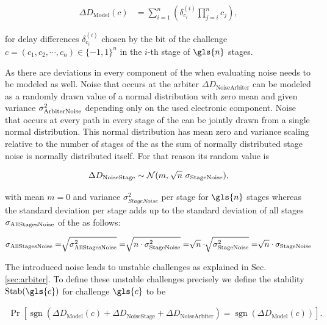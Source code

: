 \begin{align*}
\Delta D_{\mathrm{Model}}(c) &= \sum_{i=1}^{n}\left(\delta_{c_{i}}^{(i)}\prod_{j=i}^{n}c_{j}\right),
\end{align*}

for delay differences $\delta_{c_{i}}^{(i)}$ chosen by the bit of the challenge $c = (c_1, c_2, \cdots, c_n) \in \{-1, 1\}^n$ in the $i$-th stage of $\gls{n}$ stages.

As there are deviations in every component of the \puf when evaluating noise needs to be modeled as well.
Noise that occurs at the arbiter $\Delta D_{\mathrm{Noise Arbiter}}$ can be modeled as a randomly drawn value of a normal distribution with zero mean and given variance $\sigma_{\mathrm{Arbiter Noise}}^2$ depending only on the used electronic component.
Noise that occurs at every path in every stage of the \apuf can be jointly drawn from a single normal distribution.
This normal distribution has mean zero and variance scaling relative to the number of stages of the \apuf as the sum of normally distributed stage noise is normally distributed itself.
For that reason its random value is 

\begin{align*}
\Delta D_{\mathrm{Noise Stage}} \sim \mathcal{N} (m,\ \sqrt[]{n}\ \sigmaSNoise),
\end{align*}

with mean $m = 0$ and variance $\sigma_{Stage Noise}^2$ per stage for $\gls{n}$ stages whereas the standard deviation per stage adds up to the standard deviation of all stages $\sigma_{\mathrm{All Stages Noise}}$ of the \puf as follows:

\begin{align*}
\sigma_{\mathrm{All Stages Noise}} = \sqrt[]{\sigma_{\mathrm{All Stages Noise}}^2} = \sqrt[]{n \cdot \sigma_{\mathrm{Stage Noise}}^2} = \sqrt[]{n} \cdot \sqrt[]{\sigma_{\mathrm{Stage Noise}}^2} = \sqrt[]{n} \cdot \sigma_{\mathrm{Stage Noise}}
\end{align*}

The introduced noise leads to unstable challenges as explained in Sec. \ref{sec:arbiter}.
To define these unstable challenges precisely we define the stability $\Stab(\gls{c})$ for challenge $\gls{c}$ to be

\begin{align}
\Pr[\operatorname{sgn}(\Delta D_{\mathrm{Model}}(c) + \Delta D_{\mathrm{Noise Stage}} + \Delta D_{\mathrm{Noise Arbiter}}) = \operatorname{sgn}(\Delta D_{\mathrm{Model}}(c))]. \label{equ:stability}
\end{align}

